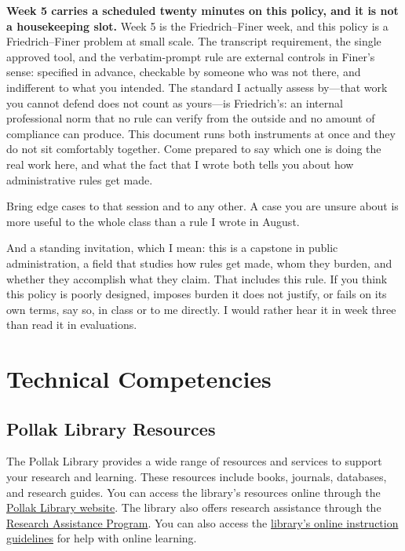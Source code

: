 \documentclass[11pt]{article}     %
\begin{document}
\vspace{0.5em}
\noindent \textbf{Week 5 carries a scheduled twenty minutes on this policy, and it is not a housekeeping slot.} Week 5 is the Friedrich--Finer week, and this policy is a Friedrich--Finer problem at small scale. The transcript requirement, the single approved tool, and the verbatim-prompt rule are external controls in Finer's sense: specified in advance, checkable by someone who was not there, and indifferent to what you intended. The standard I actually assess by---that work you cannot defend does not count as yours---is Friedrich's: an internal professional norm that no rule can verify from the outside and no amount of compliance can produce. This document runs both instruments at once and they do not sit comfortably together. Come prepared to say which one is doing the real work here, and what the fact that I wrote both tells you about how administrative rules get made.

\vspace{0.5em}
\noindent Bring edge cases to that session and to any other. A case you are unsure about is more useful to the whole class than a rule I wrote in August.

\vspace{0.5em}
\noindent And a standing invitation, which I mean: this is a capstone in public administration, a field that studies how rules get made, whom they burden, and whether they accomplish what they claim. That includes this rule. If you think this policy is poorly designed, imposes burden it does not justify, or fails on its own terms, say so, in class or to me directly. I would rather hear it in week three than read it in evaluations.

\section*{Technical Competencies}

\subsection*{Pollak Library Resources}

The Pollak Library provides a wide range of resources and services to support your research and learning. These resources include books, journals, databases, and research guides. You can access the library's resources online through the \href{http://www.library.fullerton.edu/}{Pollak Library website}. The library also offers research assistance through the \href{http://www.library.fullerton.edu/research/}{Research Assistance Program}. You can also access the \href{http://www.library.fullerton.edu/about/guidelines/online-instruction-guidelines.php}{library's online instruction guidelines} for help with online learning.
\end{document}
